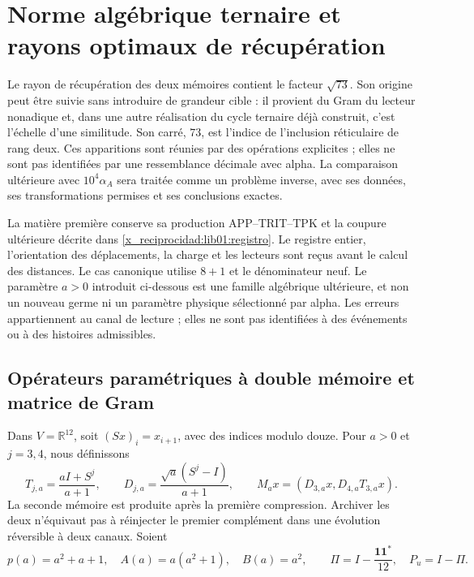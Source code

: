 \chapter{Norme algébrique ternaire et rayons optimaux de récupération}
\label{x_reciprocidad:lib02:norma-ternaria}

Le rayon de récupération des deux mémoires contient le facteur
\(\sqrt{73}\). Son origine peut être suivie sans introduire de grandeur
cible : il provient du Gram du lecteur nonadique et, dans une autre réalisation du
cycle ternaire déjà construit, c’est l’échelle d’une similitude. Son carré,
\(73\), est l’indice de l’inclusion réticulaire de rang deux. Ces
apparitions sont réunies par des opérations explicites ;
elles ne sont pas identifiées par une ressemblance décimale avec alpha. La comparaison
ultérieure avec \(10^4\alpha_A\) sera traitée comme un problème inverse,
avec ses données, ses transformations permises et ses conclusions exactes.

La matière première conserve sa production APP--TRIT--TPK et la coupure ultérieure décrite dans \cref{x_reciprocidad:lib01:registro}. Le registre entier, l'orientation des déplacements, la charge et les lecteurs sont reçus avant le calcul des distances. Le cas canonique utilise \(8+1\) et le dénominateur neuf. Le paramètre \(a>0\) introduit ci-dessous est une famille algébrique ultérieure, et non un nouveau germe ni un paramètre physique sélectionné par alpha. Les erreurs appartiennent au canal de lecture ; elles ne sont pas identifiées à des événements ou à des histoires admissibles.

\section{Opérateurs paramétriques à double mémoire et matrice de Gram}
\label{x_reciprocidad:lib02:familia-memoria}

Dans \(V=\mathbb R^{12}\), soit \((Sx)_i=x_{i+1}\), avec des indices modulo
douze. Pour \(a>0\) et \(j=3,4\), nous définissons
\begin{equation}
 T_{j,a}=\frac{aI+S^j}{a+1},\qquad
 D_{j,a}=\frac{\sqrt a(S^j-I)}{a+1},\qquad
 M_ax=(D_{3,a}x,D_{4,a}T_{3,a}x).
 \label{x_reciprocidad:lib02:lectores}
\end{equation}
La seconde mémoire est produite après la première compression. Archiver
les deux n’équivaut pas à réinjecter le premier complément dans une évolution
réversible à deux canaux. Soient
\[
 p(a)=a^2+a+1,\quad A(a)=a(a^2+1),\quad B(a)=a^2,
 \qquad\Pi=I-\frac{\mathbf1\mathbf1^*}{12},\quad P_u=I-\Pi.
\]

